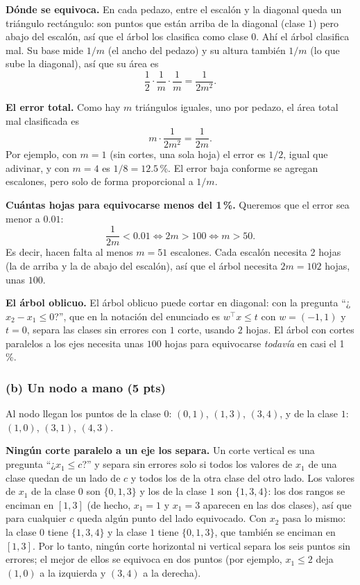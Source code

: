 \documentclass[11pt, letterpaper]{article}
\begin{document}
\textbf{Dónde se equivoca.} En cada pedazo, entre el escalón y la diagonal queda un triángulo rectángulo: son puntos que están arriba de la diagonal (clase $1$) pero abajo del escalón, así que el árbol los clasifica como clase $0$. Ahí el árbol clasifica mal. Su base mide $1/m$ (el ancho del pedazo) y su altura también $1/m$ (lo que sube la diagonal), así que su área es
\[
    \frac{1}{2}\cdot\frac{1}{m}\cdot\frac{1}{m} = \frac{1}{2m^2}.
\]

\textbf{El error total.} Como hay $m$ triángulos iguales, uno por pedazo, el área total mal clasificada es
\[
    m \cdot \frac{1}{2m^2} = \frac{1}{2m}.
\]
Por ejemplo, con $m = 1$ (sin cortes, una sola hoja) el error es $1/2$, igual que adivinar, y con $m = 4$ es $1/8 = 12.5$\,\%. El error baja conforme se agregan escalones, pero solo de forma proporcional a $1/m$.

\textbf{Cuántas hojas para equivocarse menos del 1\,\%.} Queremos que el error sea menor a $0.01$:
\[
    \frac{1}{2m} < 0.01 \iff 2m > 100 \iff m > 50.
\]
Es decir, hacen falta al menos $m = 51$ escalones. Cada escalón necesita 2 hojas (la de arriba y la de abajo del escalón), así que el árbol necesita $2m = 102$ hojas, unas $100$.

\textbf{El árbol oblicuo.} El árbol oblicuo puede cortar en diagonal: con la pregunta ``¿$x_2 - x_1 \le 0$?'', que en la notación del enunciado es $w^\top x \le t$ con $w = (-1, 1)$ y $t = 0$, separa las clases sin errores con $1$ corte, usando $2$ hojas. El árbol con cortes paralelos a los ejes necesita unas $100$ hojas para equivocarse \emph{todavía} en casi el 1\,\%.

\subsubsection*{(b) Un nodo a mano (5 pts)}

Al nodo llegan los puntos de la clase $0$: $(0,1)$, $(1,3)$, $(3,4)$, y de la clase $1$: $(1,0)$, $(3,1)$, $(4,3)$.

\textbf{Ningún corte paralelo a un eje los separa.} Un corte vertical es una pregunta ``¿$x_1 \le c$?'' y separa sin errores solo si todos los valores de $x_1$ de una clase quedan de un lado de $c$ y todos los de la otra clase del otro lado. Los valores de $x_1$ de la clase $0$ son $\{0, 1, 3\}$ y los de la clase $1$ son $\{1, 3, 4\}$: los dos rangos se enciman en $[1, 3]$ (de hecho, $x_1 = 1$ y $x_1 = 3$ aparecen en las dos clases), así que para cualquier $c$ queda algún punto del lado equivocado. Con $x_2$ pasa lo mismo: la clase $0$ tiene $\{1, 3, 4\}$ y la clase $1$ tiene $\{0, 1, 3\}$, que también se enciman en $[1, 3]$. Por lo tanto, ningún corte horizontal ni vertical separa los seis puntos sin errores; el mejor de ellos se equivoca en dos puntos (por ejemplo, $x_1 \le 2$ deja $(1,0)$ a la izquierda y $(3,4)$ a la derecha).
\end{document}
